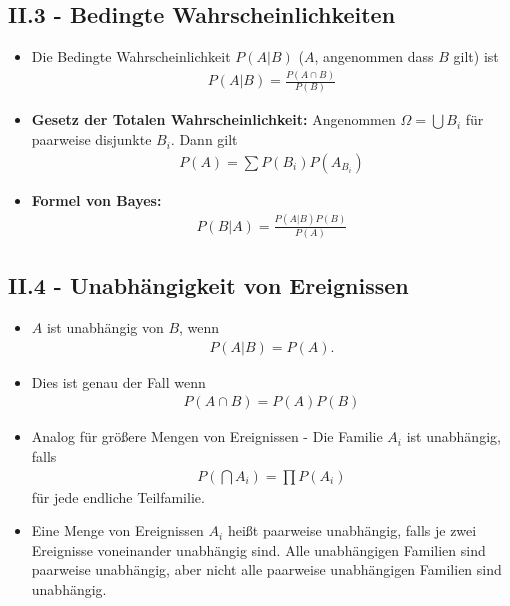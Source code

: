 \documentclass{scrartcl}
\begin{document}
\subsection*{II.3 - Bedingte Wahrscheinlichkeiten}
\begin{itemize}
    \item Die Bedingte Wahrscheinlichkeit $P(A|B)$ ($A$, angenommen dass $B$ gilt) ist
    \begin{align*}
        P(A|B) = \frac{P(A \cap B)}{P(B)}
    \end{align*}
    \item \textbf{Gesetz der Totalen Wahrscheinlichkeit:}
    Angenommen $\Omega = \bigcup B_i$ für paarweise disjunkte $B_i$. Dann gilt
    \begin{align*}
        P(A) = \sum P(B_i)P(A_{B_i})
    \end{align*}
    \item \textbf{Formel von Bayes:}
    \begin{align*}
        P(B|A) = \frac{P(A|B)P(B)}{P(A)} 
    \end{align*}
\end{itemize}
\subsection*{II.4 - Unabhängigkeit von Ereignissen}
\begin{itemize}
    \item $A$ ist unabhängig von $B$, wenn
    \begin{align*}
        P(A|B) = P(A).
    \end{align*}
    \item Dies ist genau der Fall wenn
    \begin{align*}
        P(A \cap B) = P(A)P(B)
    \end{align*}
    \item Analog für größere Mengen von Ereignissen - Die Familie $A_i$ ist unabhängig, falls
    \begin{align*}
        P\left(\bigcap A_i\right) = \prod P(A_i)
    \end{align*}
    für jede endliche Teilfamilie.
    \item Eine Menge von Ereignissen $A_i$ heißt paarweise unabhängig, falls je zwei Ereignisse voneinander unabhängig sind. Alle unabhängigen Familien sind paarweise unabhängig, aber nicht alle paarweise unabhängigen Familien sind unabhängig.
\end{itemize}
\end{document}
